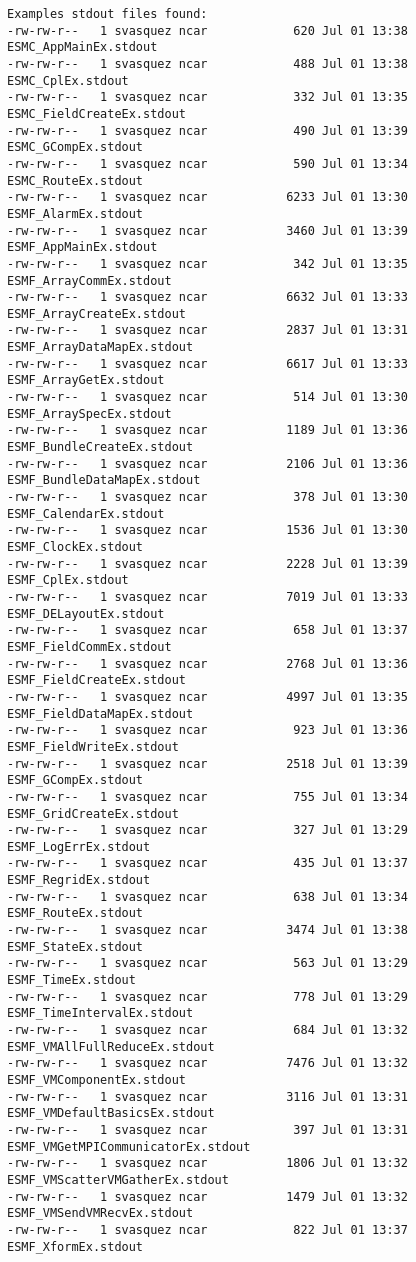 \begin{verbatim}
Examples stdout files found: 
-rw-rw-r--   1 svasquez ncar            620 Jul 01 13:38 ESMC_AppMainEx.stdout
-rw-rw-r--   1 svasquez ncar            488 Jul 01 13:38 ESMC_CplEx.stdout
-rw-rw-r--   1 svasquez ncar            332 Jul 01 13:35 ESMC_FieldCreateEx.stdout
-rw-rw-r--   1 svasquez ncar            490 Jul 01 13:39 ESMC_GCompEx.stdout
-rw-rw-r--   1 svasquez ncar            590 Jul 01 13:34 ESMC_RouteEx.stdout
-rw-rw-r--   1 svasquez ncar           6233 Jul 01 13:30 ESMF_AlarmEx.stdout
-rw-rw-r--   1 svasquez ncar           3460 Jul 01 13:39 ESMF_AppMainEx.stdout
-rw-rw-r--   1 svasquez ncar            342 Jul 01 13:35 ESMF_ArrayCommEx.stdout
-rw-rw-r--   1 svasquez ncar           6632 Jul 01 13:33 ESMF_ArrayCreateEx.stdout
-rw-rw-r--   1 svasquez ncar           2837 Jul 01 13:31 ESMF_ArrayDataMapEx.stdout
-rw-rw-r--   1 svasquez ncar           6617 Jul 01 13:33 ESMF_ArrayGetEx.stdout
-rw-rw-r--   1 svasquez ncar            514 Jul 01 13:30 ESMF_ArraySpecEx.stdout
-rw-rw-r--   1 svasquez ncar           1189 Jul 01 13:36 ESMF_BundleCreateEx.stdout
-rw-rw-r--   1 svasquez ncar           2106 Jul 01 13:36 ESMF_BundleDataMapEx.stdout
-rw-rw-r--   1 svasquez ncar            378 Jul 01 13:30 ESMF_CalendarEx.stdout
-rw-rw-r--   1 svasquez ncar           1536 Jul 01 13:30 ESMF_ClockEx.stdout
-rw-rw-r--   1 svasquez ncar           2228 Jul 01 13:39 ESMF_CplEx.stdout
-rw-rw-r--   1 svasquez ncar           7019 Jul 01 13:33 ESMF_DELayoutEx.stdout
-rw-rw-r--   1 svasquez ncar            658 Jul 01 13:37 ESMF_FieldCommEx.stdout
-rw-rw-r--   1 svasquez ncar           2768 Jul 01 13:36 ESMF_FieldCreateEx.stdout
-rw-rw-r--   1 svasquez ncar           4997 Jul 01 13:35 ESMF_FieldDataMapEx.stdout
-rw-rw-r--   1 svasquez ncar            923 Jul 01 13:36 ESMF_FieldWriteEx.stdout
-rw-rw-r--   1 svasquez ncar           2518 Jul 01 13:39 ESMF_GCompEx.stdout
-rw-rw-r--   1 svasquez ncar            755 Jul 01 13:34 ESMF_GridCreateEx.stdout
-rw-rw-r--   1 svasquez ncar            327 Jul 01 13:29 ESMF_LogErrEx.stdout
-rw-rw-r--   1 svasquez ncar            435 Jul 01 13:37 ESMF_RegridEx.stdout
-rw-rw-r--   1 svasquez ncar            638 Jul 01 13:34 ESMF_RouteEx.stdout
-rw-rw-r--   1 svasquez ncar           3474 Jul 01 13:38 ESMF_StateEx.stdout
-rw-rw-r--   1 svasquez ncar            563 Jul 01 13:29 ESMF_TimeEx.stdout
-rw-rw-r--   1 svasquez ncar            778 Jul 01 13:29 ESMF_TimeIntervalEx.stdout
-rw-rw-r--   1 svasquez ncar            684 Jul 01 13:32 ESMF_VMAllFullReduceEx.stdout
-rw-rw-r--   1 svasquez ncar           7476 Jul 01 13:32 ESMF_VMComponentEx.stdout
-rw-rw-r--   1 svasquez ncar           3116 Jul 01 13:31 ESMF_VMDefaultBasicsEx.stdout
-rw-rw-r--   1 svasquez ncar            397 Jul 01 13:31 ESMF_VMGetMPICommunicatorEx.stdout
-rw-rw-r--   1 svasquez ncar           1806 Jul 01 13:32 ESMF_VMScatterVMGatherEx.stdout
-rw-rw-r--   1 svasquez ncar           1479 Jul 01 13:32 ESMF_VMSendVMRecvEx.stdout
-rw-rw-r--   1 svasquez ncar            822 Jul 01 13:37 ESMF_XformEx.stdout


\end{verbatim}
